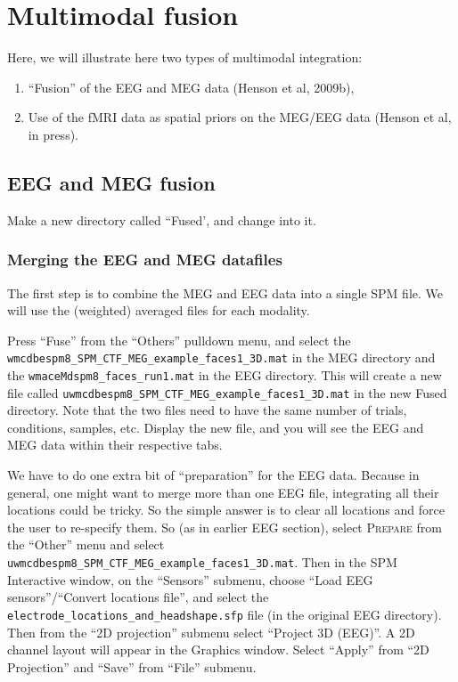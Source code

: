 \section{Multimodal fusion\label{multimodal:fusion}}

Here, we will illustrate here two types of multimodal integration:
\begin{enumerate}
 \item ``Fusion'' of the EEG and MEG data (Henson et al, 2009b),
 \item Use of the fMRI data as spatial priors on the MEG/EEG data (Henson et al, in press).
\end{enumerate}

\subsection{EEG and MEG fusion \label{multimodal:fusion:eegmeg:fusion}}

Make a new directory called ``Fused', and change into it.

\subsubsection{Merging the EEG and MEG datafiles \label{multimodal:fusion:eegmeg:merge}}

The first step is to combine the MEG and EEG data into a single SPM file. We will use the (weighted) averaged files for each modality.

Press ``Fuse'' from the ``Others'' pulldown menu, and select the \texttt{wmcdbespm8\_\-SPM\_\-CTF\_\-MEG\_\-example\_\-faces1\_\-3D.mat} in the MEG directory and the \texttt{wmaceMdspm8\_faces\_run1.mat} in the EEG directory. This will create a new file called \texttt{uwmcdbespm8\_\-SPM\_\-CTF\_\-MEG\_\-example\_\-faces1\_\-3D.mat} in the new Fused directory. Note that the two files need to have the same number of trials, conditions, samples, etc. Display the new file, and you will see the EEG and MEG data within their respective tabs.

We have to do one extra bit of ``preparation'' for the EEG data. Because in general, one might want to merge more than one EEG file, integrating all their locations could be tricky. So the simple answer is to clear all locations and force the user to re-specify them. So (as in earlier EEG section), select \textsc{Prepare} from the ``Other'' menu and select \texttt{uwmcdbespm8\_\-SPM\_\-CTF\_\-MEG\_\-example\_\-faces1\_\-3D.mat}. Then in the SPM Interactive window, on the ``Sensors'' submenu, choose ``Load EEG sensors''/``Convert locations file'', and select the \texttt{electrode\_locations\_and\_headshape.sfp} file (in the original EEG directory). Then from the ``2D projection'' submenu select ``Project 3D (EEG)''. A 2D channel layout will appear in the Graphics window. Select ``Apply'' from ``2D Projection'' and ``Save'' from ``File'' submenu.

